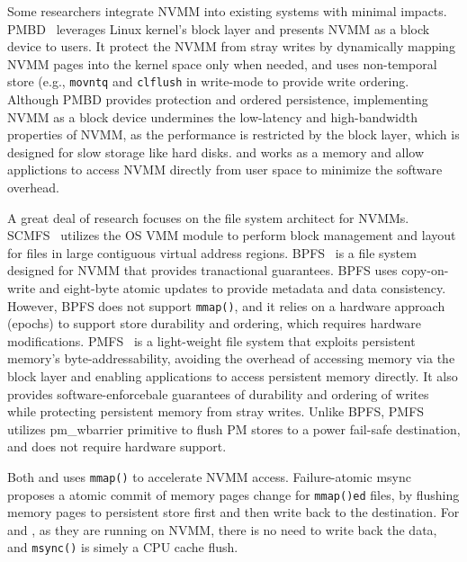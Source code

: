 Some researchers integrate NVMM into existing systems with minimal impacts.
PMBD~\cite{PMBD} leverages Linux kernel's block layer and presents NVMM as
a block device to users. It protect the NVMM from stray writes by dynamically
mapping NVMM pages into the kernel space only when needed, and uses non-temporal
store (e.g., \texttt{movntq} and \texttt{clflush} in write-mode to provide write
ordering.  Although PMBD provides protection and ordered persistence,
implementing NVMM as a block device undermines the low-latency and
high-bandwidth properties of NVMM, as the performance is restricted by the
block layer, which is designed for slow storage like hard disks. \DAChell{}
and \CChell{} works as a memory and allow applictions to access NVMM directly
from user space to minimize the software overhead.

A great deal of research focuses on the file system architect for NVMMs.
SCMFS~\cite{scmfs} utilizes the OS VMM module to perform  block
management and layout for files in large contiguous virtual address regions.
BPFS~\cite{BPFS} is a file system designed for NVMM that provides
tranactional guarantees. BPFS uses copy-on-write and eight-byte 
atomic updates to provide metadata and data consistency. However, BPFS does
not support \texttt{mmap()}, and it relies on a hardware approach (epochs)
to support store durability and ordering, which requires hardware
modifications.  PMFS~\cite{PMFS} is a light-weight
file system that exploits persistent memory's byte-addressability, avoiding the
overhead of accessing memory via the block layer and enabling applications to
access persistent memory directly.  It also provides software-enforcebale guarantees of durability
and ordering of writes while protecting persistent memory from stray writes.
Unlike BPFS, PMFS utilizes pm\_wbarrier primitive to flush PM stores to a power
fail-safe destination, and does not require hardware support.

Both \DAChell{} and \CChell uses \texttt{mmap()} to accelerate NVMM access.
Failure-atomic msync~\cite{atomicmsync} proposes a atomic commit of memory
pages change for \texttt{mmap()ed} files, by flushing memory pages to persistent
store first and then write back to the destination. For \DAChell{} and \CChell{}, as they are running on NVMM, there is no need to write back the data, and
\texttt{msync()} is simely a CPU cache flush.

\begin{comment}
We see two potential future improvements for \Chell{}. First, we hope to improve
it by adding
strong consistency and protection from malicious writes. Second, at present 
\Chell{} cannot avoid
\texttt{memcpy()} entirely, because POSIX APIs provide user buffers to fill with
data. If we modify the POSIX interfaces that return cache pages to applications
directly we can eliminate \texttt{memcpy}.
\end{comment}
